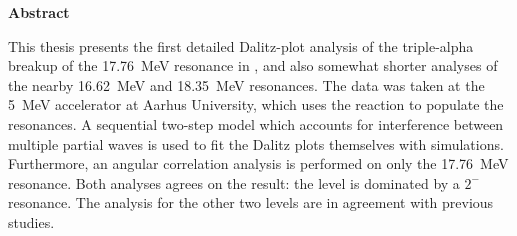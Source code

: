 \thispagestyle{plain}
\begin{center}
	\large
	\textbf{Abstract}
\end{center}
This thesis presents the first detailed Dalitz-plot analysis of the triple-alpha breakup of the \SI{17.76}{MeV} resonance in , and also somewhat shorter analyses of the nearby \SI{16.62}{MeV} and \SI{18.35}{MeV} resonances. The data was taken at the \SI{5}{MeV} accelerator at Aarhus University, which uses the  reaction to populate the resonances. A sequential two-step model which accounts for interference between multiple partial waves is used to fit the Dalitz plots themselves with simulations. Furthermore, an angular correlation analysis is performed on only the \SI{17.76}{MeV} resonance. Both analyses agrees on the result: the level is dominated by a $2^-$ resonance. The analysis for the other two levels are in agreement with previous studies. 